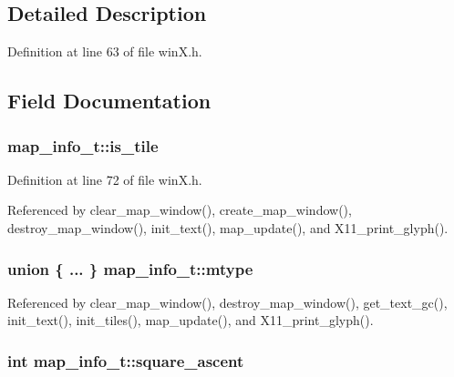 \subsection{Detailed Description}


Definition at line 63 of file win\+X.\+h.



\subsection{Field Documentation}
\hypertarget{structmap__info__t_a2e6326b9aa9caa2d1663125c45966979}{
\subsubsection[{is\+\_\+tile}]{ map\+\_\+info\+\_\+t\+::is\+\_\+tile}}\label{structmap__info__t_a2e6326b9aa9caa2d1663125c45966979}


Definition at line 72 of file win\+X.\+h.



Referenced by clear\+\_\+map\+\_\+window(), create\+\_\+map\+\_\+window(), destroy\+\_\+map\+\_\+window(), init\+\_\+text(), map\+\_\+update(), and X11\+\_\+print\+\_\+glyph().

\hypertarget{structmap__info__t_a3166d09951aa9aecbcd6d1ee2d6d32fb}{
\subsubsection[{mtype}]{\setlength{\rightskip}{0pt plus 5cm}union \{ ... \}   map\+\_\+info\+\_\+t\+::mtype}}\label{structmap__info__t_a3166d09951aa9aecbcd6d1ee2d6d32fb}


Referenced by clear\+\_\+map\+\_\+window(), destroy\+\_\+map\+\_\+window(), get\+\_\+text\+\_\+gc(), init\+\_\+text(), init\+\_\+tiles(), map\+\_\+update(), and X11\+\_\+print\+\_\+glyph().

\hypertarget{structmap__info__t_a9275412eabdcb189618c01314406b1ad}{
\subsubsection[{square\+\_\+ascent}]{\setlength{\rightskip}{0pt plus 5cm}int map\+\_\+info\+\_\+t\+::square\+\_\+ascent}}\label{structmap__info__t_a9275412eabdcb189618c01314406b1ad}


